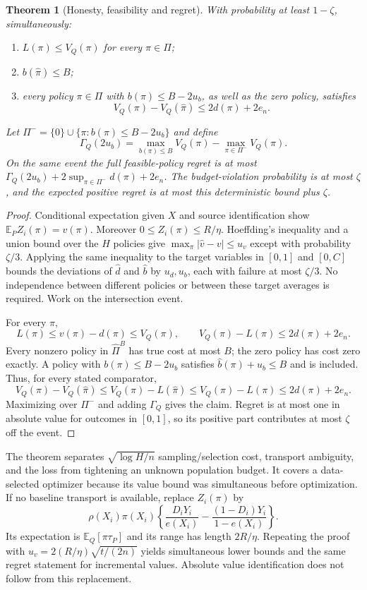 \documentclass[11pt]{article}
\newtheorem{theorem}{Theorem}
\theoremstyle{remark}
\newcommand{\E}{\mathbb E}
\begin{document}
\begin{theorem}[Honesty, feasibility and regret]\label{policythm}
With probability at least $1-\zeta$, simultaneously:
\begin{enumerate}
\item $L(\pi)\leq V_Q(\pi)$ for every $\pi\in\Pi$;
\item $b(\widehat\pi)\leq B$;
\item every policy $\pi\in\Pi$ with $b(\pi)\leq B-2u_b$, as well as the zero policy, satisfies
\[
 V_Q(\pi)-V_Q(\widehat\pi)\leq2d(\pi)+2e_n.
\]
\end{enumerate}
Let $\Pi^- =\{0\}\cup\{\pi:b(\pi)\leq B-2u_b\}$ and define
\[
 \Gamma_Q(2u_b)=\max_{b(\pi)\leq B}V_Q(\pi)
                         -\max_{\pi\in\Pi^-}V_Q(\pi).
\]
On the same event the full feasible-policy regret is at most
$\Gamma_Q(2u_b)+2\sup_{\pi\in\Pi^-}d(\pi)+2e_n$.
The budget-violation probability is at most $\zeta$, and the expected positive regret is at most this deterministic bound plus $\zeta$.
\end{theorem}
\begin{proof}
Conditional expectation given $X$ and source identification show $\E_P Z_i(\pi)=v(\pi)$. Moreover $0\leq Z_i(\pi)\leq R/\eta$. Hoeffding's inequality and a union bound over the $H$ policies give
$\max_\pi|\widehat v-v|\leq u_v$ except with probability $\zeta/3$. Applying the same inequality to the target variables in $[0,1]$ and $[0,C]$ bounds the deviations of $\widehat d$ and $\widehat b$ by $u_d,u_b$, each with failure at most $\zeta/3$. No independence between different policies or between these target averages is required. Work on the intersection event.

For every $\pi$,
\[
 L(\pi)\leq v(\pi)-d(\pi)\leq V_Q(\pi),\qquad
 V_Q(\pi)-L(\pi)\leq2d(\pi)+2e_n.
\]
Every nonzero policy in $\widehat\Pi^B$ has true cost at most $B$; the zero policy has cost zero exactly. A policy with $b(\pi)\leq B-2u_b$ satisfies $\widehat b(\pi)+u_b\leq B$ and is included. Thus, for every stated comparator,
\[
 V_Q(\pi)-V_Q(\widehat\pi)
 \leq V_Q(\pi)-L(\widehat\pi)
 \leq V_Q(\pi)-L(\pi)\leq2d(\pi)+2e_n.
\]
Maximizing over $\Pi^-$ and adding $\Gamma_Q$ gives the claim. Regret is at most one in absolute value for outcomes in $[0,1]$, so its positive part contributes at most $\zeta$ off the event.
\end{proof}

The theorem separates $\sqrt{\log H/n}$ sampling/selection cost, transport ambiguity, and the loss from tightening an unknown population budget. It covers a data-selected optimizer because its value bound was simultaneous before optimization. If no baseline transport is available, replace $Z_i(\pi)$ by
\[
 \rho(X_i)\pi(X_i)\left\{\frac{D_iY_i}{e(X_i)}
                   -\frac{(1-D_i)Y_i}{1-e(X_i)}\right\}.
\]
Its expectation is $\E_Q[\pi\tau_P]$ and its range has length $2R/\eta$. Repeating the proof with $u_v=2(R/\eta)\sqrt{t/(2n)}$ yields simultaneous lower bounds and the same regret statement for incremental values. Absolute value identification does not follow from this replacement.
\end{document}
